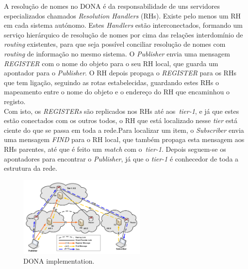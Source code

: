 \documentclass[conference]{IEEEtran}
\begin{document}
A resolu\c{c}\~{a}o de nomes no DONA\cite{dona} \'{e} da responsabilidade de uns servidores especializados chamados \textit{Resolution Handlers} (RHs). Existe pelo menos um RH em cada sistema aut\'{o}nomo. Estes \textit{Handlers} est\~{a}o interconectados, formando um servi\c{c}o hier\'{a}rquico de resolu\c{c}\~{a}o de nomes por cima das rela\c{c}\~{o}es interdom\'{i}nio de \textit{routing} existentes, para que seja poss\'{i}vel conciliar resolu\c{c}\~{a}o de nomes com \textit{routing} de informa\c{c}\~{a}o no mesmo sistema. O \textit{Publisher} envia uma mensagem \textit{REGISTER} com o nome do objeto para o seu RH local, que guarda um apontador para o \textit{Publisher}. O RH depois propaga o \textit{REGISTER} para os RHs que tem liga\c{c}\~{a}o, seguindo as rotas estabelecidas, guardando estes RHs o mapeamento entre o nome do objeto e o endere\c{c}o do RH que encaminhou o registo.\\

 Com isto, os \textit{REGISTERs} s\~{a}o replicados nos RHs at\'{e} aos~\textit{tier-1}, e j\'{a} que estes est\~{a}o conectados com os outros todos, o RH que est\'{a} localizado nesse \textit{tier} est\'{a} ciente do que se passa em toda a rede.Para localizar um item, o \textit{Subscriber} envia uma mensagem \textit{FIND} para o RH local, que tamb\'{e}m propaga esta mensagem aos RHs parentes, at\'{e} que \'{e} feito um \textit{match} com o~\textit{tier-1}. Depois seguem-se os apontadores para encontrar o \textit{Publisher}, j\'{a} que o \textit{tier-1} \'{e} conhecedor de toda a estrutura da rede.\\





\begin{figure}[h]
\centering
\includegraphics[width=2.5in]{dona}
\caption{DONA implementation.}
\label{dona}
\end{figure}

\end{document}

